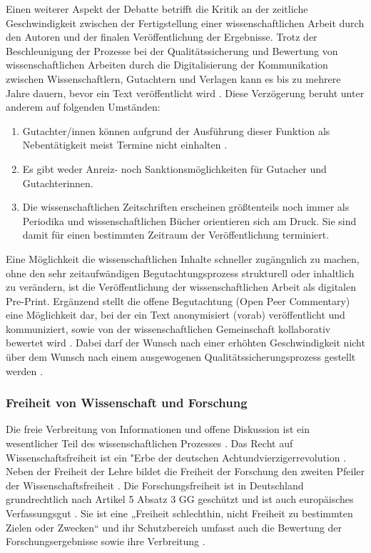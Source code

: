 Einen weiterer Aspekt der Debatte betrifft die Kritik an der zeitliche Geschwindigkeit zwischen der Fertigstellung einer wissenschaftlichen Arbeit durch den Autoren und der finalen Veröffentlichung der Ergebnisse. Trotz der Beschleunigung der Prozesse bei der Qualitätssicherung und Bewertung von wissenschaftlichen Arbeiten durch die Digitalisierung der Kommunikation zwischen Wissenschaftlern, Gutachtern und Verlagen kann es bis zu mehrere Jahre dauern, bevor ein Text veröffentlicht wird \cite{suchen}. Diese Verzögerung beruht unter anderem auf folgenden Umständen:

\begin{enumerate}
\item Gutachter/innen können aufgrund der Ausführung dieser Funktion als Nebentätigkeit meist Termine nicht einhalten \cite{bar_2009_wissenschaftliche}.
\item Es gibt weder Anreiz- noch Sanktionsmöglichkeiten für Gutacher und Gutachterinnen.
\item Die wissenschaftlichen Zeitschriften erscheinen größtenteils noch immer als Periodika und wissenschaftlichen Bücher orientieren sich am Druck. Sie sind damit für einen bestimmten Zeitraum der Veröffentlichung terminiert.
\end{enumerate}

Eine Möglichkeit die wissenschaftlichen Inhalte schneller zugängnlich zu machen, ohne den sehr zeitaufwändigen Begutachtungsprozess strukturell oder inhaltlich zu verändern, ist die Veröffentlichung der wissenschaftlichen Arbeit als digitalen Pre-Print. Ergänzend stellt die offene Begutachtung (Open Peer Commentary) eine Möglichkeit dar, bei der ein Text anonymisiert (vorab) veröffentlicht und kommuniziert, sowie von der wissenschaftlichen Gemeinschaft kollaborativ bewertet wird \cite{mueller_2009_peerreview}. Dabei darf der Wunsch nach einer erhöhten Geschwindigkeit nicht über dem Wunsch nach einem ausgewogenen Qualitätssicherungsprozess gestellt werden \cite{Beall_2012}.

\subsubsection{Freiheit von Wissenschaft und Forschung}

Die freie Verbreitung von Informationen und offene Diskussion ist ein wesentlicher Teil des wissenschaftlichen Prozesses \cite{edsall_1976_scientific}. Das Recht auf Wissenschaftsfreiheit ist ein "Erbe der deutschen Achtundvierzigerrevolution \cite{kempny_2013_wissfreiheit}. Neben der Freiheit der Lehre bildet die Freiheit der Forschung den zweiten Pfeiler der Wissenschaftsfreiheit \cite{thurnherr_2014_pubfreiheit}. Die Forschungsfreiheit ist in Deutschland grundrechtlich nach Artikel 5 Absatz 3 GG  geschützt und ist auch europäisches Verfassungsgut \cite{kempny_2013_wissfreiheit}. Sie ist eine „Freiheit schlechthin, nicht Freiheit zu bestimmten Zielen oder Zwecken“ \cite{Boeckenfoerde_1974} und ihr Schutzbereich umfasst auch die Bewertung der Forschungsergebnisse sowie ihre Verbreitung \cite{Pfeiffer_2013_forschungsfreiheit}.

